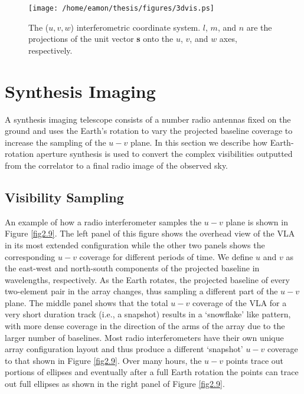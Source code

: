 \begin{figure}[hbt!]
\centering 
          \texttt{[image: /home/eamon/thesis/figures/3dvis.ps]}
\caption[The ($u,v,w$) interferometric coordinate system.]{The ($u,v,w$) interferometric coordinate system. $l$, $m$, and $n$ are the projections of the unit vector \textbf{s} onto the $u$, $v$, and $w$ axes, respectively.}
\label{fig2.8}
\end{figure}

\section{Synthesis Imaging}\label{sec:4}
A synthesis imaging telescope consists of a number radio antennas fixed on the ground and uses the Earth's rotation to vary the projected baseline coverage to increase the sampling of the $u-v$ plane. In this section we describe how Earth-rotation aperture synthesis is used to convert the complex visibilities outputted from the correlator to a final radio image of the observed sky.
\subsection{Visibility Sampling}\label{subsec:4.1}
An example of how a radio interferometer samples the $u-v$ plane is shown in Figure \ref{fig2.9}. The left panel of this figure shows the overhead view of the VLA in its most extended configuration while the other two panels shows the corresponding $u-v$ coverage for different periods of time. We define $u$ and $v$ as the east-west and north-south components of the projected baseline in wavelengths, respectively. As the Earth rotates, the projected baseline of every two-element pair in the array changes, thus sampling a different part of the $u-v$ plane. The middle panel shows that the total $u-v$ coverage of the VLA for a very short duration track (i.e., a snapshot) results in a `snowflake' like pattern, with more dense coverage in the direction of the arms of the array due to the larger number of baselines. Most radio interferometers have their own unique array configuration layout and thus produce a different `snapshot' $u-v$ coverage to that shown in Figure \ref{fig2.9}. Over many hours, the $u-v$ points trace out portions of ellipses and eventually after a full Earth rotation the points can trace out full ellipses as shown in the right panel of Figure \ref{fig2.9}. 

